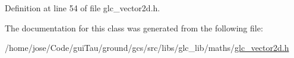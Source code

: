 Definition at line 54 of file glc\-\_\-vector2d.\-h.



The documentation for this class was generated from the following file\-:\begin{DoxyCompactItemize}
\item 
/home/jose/\-Code/gui\-Tau/ground/gcs/src/libs/glc\-\_\-lib/maths/\hyperlink{glc__vector2d_8h}{glc\-\_\-vector2d.\-h}\end{DoxyCompactItemize}
